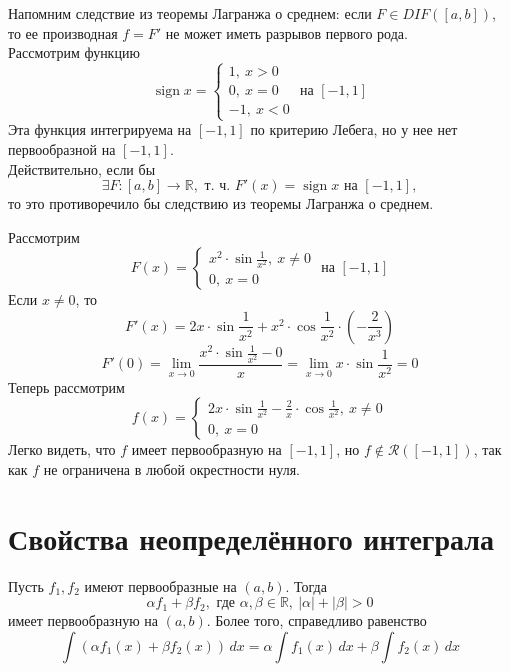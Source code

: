 \documentclass[11pt]{article}
\DeclareMathOperator{\sign}{sign}
\begin{document}
\begin{example}
    Напомним следствие из теоремы Лагранжа о среднем: если $F \in DIF([a, b])$,
    то ее производная $f = F'$ не может иметь разрывов первого рода. \\ 
    Рассмотрим функцию 
    \[\sign x = \left\{ \begin{array}{l}
        1, \ x > 0 \\ 0, \ x = 0 \\ -1, \ x < 0 
    \end{array} \right. \text{ на } [-1, 1] \]
    Эта функция интегрируема на $[-1, 1]$ по критерию Лебега, но у нее нет первообразной
    на $[-1, 1]$. \\ Действительно, если бы \[\exists F: [a, b] \to \mathbb{R}, 
    \text{ т. ч. } F'(x) = \sign x \text{ на } [-1, 1],\]
    то это противоречило бы следствию из теоремы Лагранжа о среднем.
\end{example}

\begin{example}
    Рассмотрим \[F(x) = \left\{ \begin{array}{l}
        \displaystyle x^2 \cdot \sin \frac{1}{x^2}, \ x \neq 0 \\ 
        \displaystyle 0, \ x = 0
    \end{array}\right. \text{ на } [-1, 1]\]
    Если $x \neq 0$, то \[F'(x) = 2x \cdot \sin \frac{1}{x^2} + x^2 \cdot 
    \cos \frac{1}{x^2} \cdot \left(- \frac{2}{x^3}\right)\]
    \[F'(0) = \lim_{x \to 0} \frac{\displaystyle x^2 \cdot \sin 
    \frac{1}{x^2} - 0}{x} = \lim_{x \to 0} x \cdot \sin \frac{1}{x^2} = 0\]
    Теперь рассмотрим \[f(x) = \left\{\begin{array}{l}
        \displaystyle 2x \cdot \sin \frac{1}{x^2} - \frac{2}{x} \cdot \cos \frac{1}{x^2}, \ x \neq 0 \\ 
        \displaystyle 0, \ x = 0
    \end{array}\right.\]
    Легко видеть, что $f$ имеет первообразную на $[-1, 1]$, но $f \notin \mathcal{R}([-1, 1])$, 
    так как $f$ не ограничена в любой окрестности нуля.
\end{example}

\section{Свойства неопределённого интеграла}

\begin{theorem}[Линейность]
    Пусть $f_1, f_2$ имеют первообразные на $(a, b)$. Тогда \[\alpha f_1 + \beta f_2, 
    \text{ где } \alpha, \beta \in \mathbb{R}, \ |\alpha| + |\beta| > 0\] имеет 
    первообразную на $(a, b)$. Более того, справедливо равенство 
    \[\int \left(\alpha f_1(x) + \beta f_2(x)\right) \,dx = \alpha \int f_1(x) \,dx + \beta \int f_2(x) \,dx \] 
\end{theorem}
\end{document}
